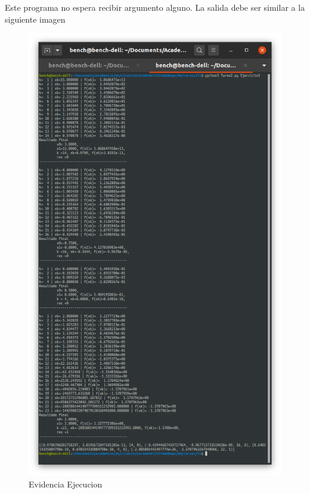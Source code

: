 \documentclass[11pt]{article}
\begin{document}
	Este programa no espera recibir argumento alguno. La salida debe ser
	similar a la siguiente imagen

	\begin{figure}
		\centering
		\includegraphics{assets/E3-1.png}
		\caption{Evidencia Ejecucion}
	\end{figure}
\end{document}

